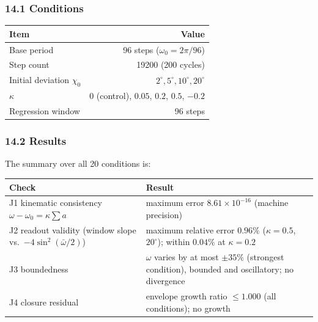 \documentclass[
  a4paper,
]{article}
\newcounter{none} %
\begin{document}
\subsubsection{14.1 Conditions}\label{conditions}

{\def\LTcaptype{none} %
\begin{longtable}[]{@{}lr@{}}
\toprule\noalign{}
Item & Value \\
\midrule\noalign{}
\endhead
\bottomrule\noalign{}
\endlastfoot
Base period & 96 steps (\(\omega_0=2\pi/96\)) \\
Step count & 19200 (200 cycles) \\
Initial deviation \(\chi_0\) & \(2^\circ,5^\circ,10^\circ,20^\circ\) \\
\(\kappa\) & \(0\) (control), \(0.05\), \(0.2\), \(0.5\), \(-0.2\) \\
Regression window & 96 steps \\
\end{longtable}
}

\subsubsection{14.2 Results}\label{results}

The summary over all 20 conditions is:

{\def\LTcaptype{none} %
\begin{longtable}[]{@{}
  >{\raggedright\arraybackslash}p{}
  >{\raggedright\arraybackslash}p{}@{}}
\toprule\noalign{}
\begin{minipage}[b]{\linewidth}\raggedright
Check
\end{minipage} & \begin{minipage}[b]{\linewidth}\raggedright
Result
\end{minipage} \\
\midrule\noalign{}
\endhead
\bottomrule\noalign{}
\endlastfoot
J1 kinematic consistency \(\omega-\omega_0=\kappa\sum a\) & maximum
error \(8.61\times10^{-16}\) (machine precision) \\
J2 readout validity (window slope vs.~\(-4\sin^2(\bar\omega/2)\)) &
maximum relative error \(0.96\%\) (\(\kappa=0.5\), \(20^\circ\)); within
\(0.04\%\) at \(\kappa=0.2\) \\
J3 boundedness & \(\omega\) varies by at most \(\pm35\%\) (strongest
condition), bounded and oscillatory; no divergence \\
J4 closure residual & envelope growth ratio \(\le1.000\) (all
conditions); no growth \\
\end{longtable}
}
\end{document}
